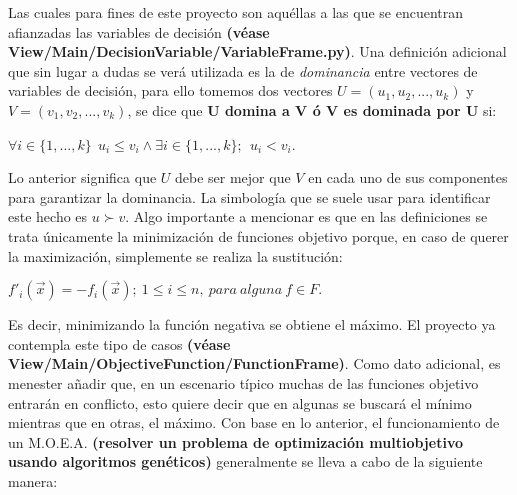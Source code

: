\documentclass[class=report, crop=false]{standalone}
\begin{document}
Las cuales para fines de este proyecto son aquéllas a las que 
se encuentran afianzadas las variables de decisión 
\textbf{(véase View/Main/DecisionVariable/VariableFrame.py)}.\medskip\break
Una definición adicional que sin lugar a dudas se verá utilizada 
es la de \emph{dominancia} entre vectores de variables de decisión,
para ello tomemos dos vectores \(U = (u_1,u_2,...,u_k)\) y \(V = (v_1,v_2,...,v_k)\), 
se dice que \textbf{U domina a V ó V es dominada por U} si:

\begin{center}\(\forall i \in \{1,...,k\}\ \ u_i \leqslant v_i \land \exists i \in \{1,...,k\}; \ \ u_i < v_i\).
\end{center}

Lo anterior significa que \(U\) debe ser mejor que \(V\) en 
cada uno de sus componentes para garantizar la dominancia.\break
La simbología que se suele usar para identificar este hecho es \(u \succ v\).\medskip\break 
Algo importante a mencionar es que en las definiciones se trata 
únicamente la minimización de funciones objetivo porque, en caso 
de querer la maximización, simplemente se realiza la sustitución:

\begin{center}\(f'_i(\vec{x}) = -f_i(\vec{x});\ 1 \leqslant i \leqslant n,\ para\ alguna\ f \in F.\)
\end{center}

Es decir, minimizando la función negativa se obtiene el máximo.\break 
El proyecto ya contempla este tipo de casos \textbf{(véase View/Main/ObjectiveFunction/}\break\textbf{FunctionFrame)}.\break
Como dato adicional, es menester añadir que, en un escenario 
típico muchas de las funciones objetivo entrarán en conflicto, 
esto quiere decir que en algunas se buscará el mínimo mientras 
que en otras, el máximo.\medskip\break
Con base en lo anterior, el funcionamiento de un M.O.E.A. 
\textbf{(resolver un problema de optimización multiobjetivo usando algoritmos genéticos)} 
generalmente se lleva a cabo de la siguiente manera:\break
\end{document}
